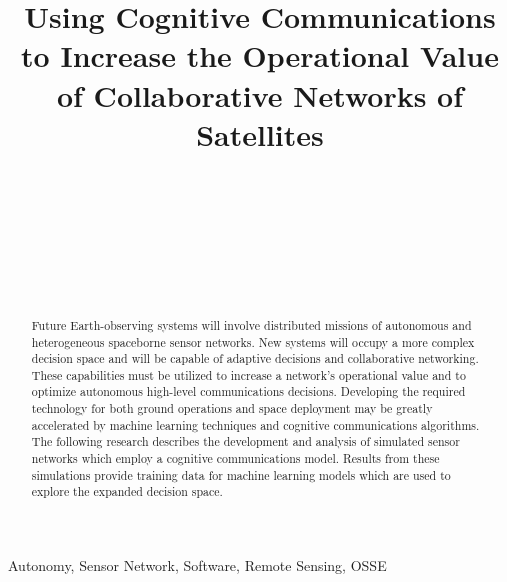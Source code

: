 \documentclass[conference]{IEEEtran}
\title{Using Cognitive Communications to Increase the Operational Value of
  Collaborative Networks of Satellites}
\author{
  \IEEEauthorblockN{Ryan B. Linnabary}
  \IEEEauthorblockA{\thisplace linnabary.24@osu.edu}
  \and
  \IEEEauthorblockN{Andrew J. O'Brien}
  \IEEEauthorblockA{\thisplace obrien.200@osu.edu}
  \and
  \IEEEauthorblockN{Graeme E. Smith}
  \IEEEauthorblockA{\thisplace smith.8347@osu.edu}
  \and
  \IEEEauthorblockN{Christopher Ball}
  \IEEEauthorblockA{\thisplace ball.51@osu.edu}
  \and {~} \and {~~~~~~~~~~~~~~~~} \and
  \IEEEauthorblockN{Joel T. Johnson}
  \IEEEauthorblockA{\thisplace johnson.1374@osu.edu}
  \and {~~~~~~} \and {~~~~~~}
}
\begin{document}
\maketitle



\begin{abstract}
  Future Earth-observing systems will involve distributed missions of autonomous
and heterogeneous spaceborne sensor networks.  New systems will occupy a more
complex decision space and will be capable of adaptive decisions and
collaborative networking.  These capabilities must be utilized to increase a
network's operational value and to optimize autonomous high-level communications
decisions.  Developing the required technology for both ground operations and
space deployment may be greatly accelerated by machine learning techniques and
cognitive communications algorithms.  The following research describes the
development and analysis of simulated sensor networks which employ a cognitive
communications model.  Results from these simulations provide training data for
machine learning models which are used to explore the expanded decision space.
\end{abstract}

\begin{IEEEkeywords}
  Autonomy, Sensor Network, Software, Remote Sensing, OSSE
\end{IEEEkeywords}

\end{document}
